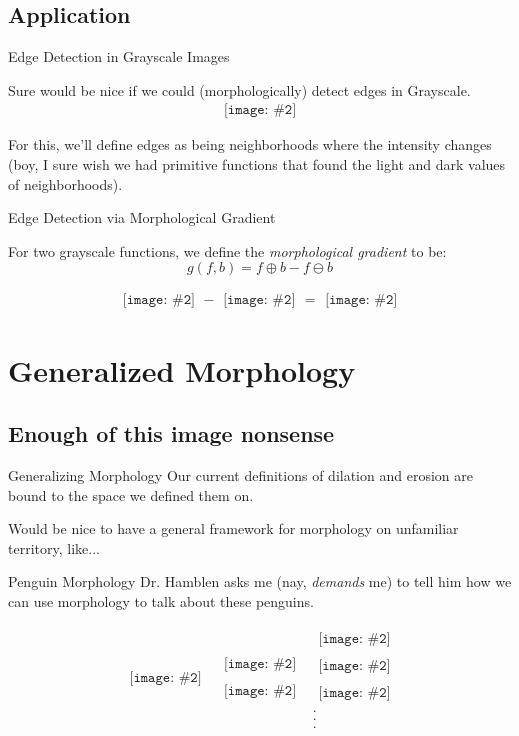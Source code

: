 \documentclass{beamer}
\newcommand{\pic}[2]{
     \begin{array}{l}
      \texttt{[image: \#2]}
      \end{array}
}
\newcommand{\dilate}{\oplus}
\newcommand{\erode}{\ominus}
\begin{document}
\subsection{Application}
\begin{frame}{Edge Detection in Grayscale Images}

  Sure would be nice if we could (morphologically) detect
  edges  in Grayscale.
  $$\pic{width=75pt}{images/grayscalecoolhamblen.png}$$
  
  For this, we'll define edges as being neighborhoods where 
  the intensity changes (boy, I sure wish we had primitive functions
  that found the light and dark values of neighborhoods).
\end{frame}

\begin{frame}{Edge Detection via Morphological Gradient}
  \begin{definition}
    For two grayscale functions, we define the 
    \emph{morphological gradient} to be:
    $$g(f,b) = f \dilate b - f \erode b$$
  \end{definition} 
  $$\pic{width=50pt}{images/coolhamblen_graydilated.png}-
    \pic{width=50pt}{images/coolhamblen_grayeroded.png}=
    \pic{width=50pt}{images/coolhamblen_gradiented.png}$$
\end{frame}


\section{Generalized Morphology}
\subsection{Enough of this image nonsense}
\begin{frame}{Generalizing Morphology}
  Our current definitions of dilation and erosion are bound to
  the space we defined them on.

  Would be nice to have a general framework for morphology on
  unfamiliar territory, like...
\end{frame}

\begin{frame}{Penguin Morphology}
  Dr. Hamblen asks me (nay, \emph{demands} me) to tell him how we can use morphology to talk about these penguins.

  $$\substack{\pic{width=30pt}{images/tux.png}}
    \substack{\pic{width=30pt}{images/tux.png}\\
             \pic{width=30pt}{images/tux.png}}
    \substack{\pic{width=30pt}{images/tux.png}\\
              \pic{width=30pt}{images/tux.png}\\
              \pic{width=30pt}{images/tux.png}\\
              .\\.\\.}$$
  
\end{frame}
\end{document}
